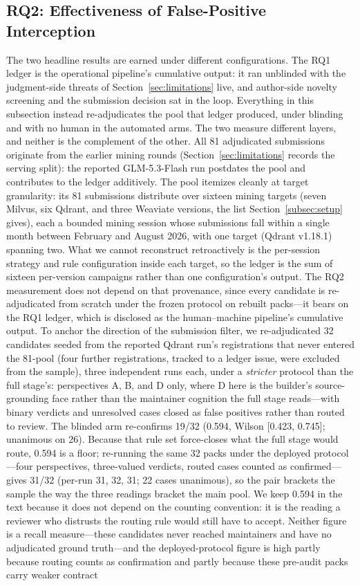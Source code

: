 \documentclass[acmsmall,screen,review,anonymous]{acmart}
\begin{document}
\subsection{RQ2: Effectiveness of False-Positive Interception}
\label{subsec:rq2}

The two headline results are earned under different configurations. The RQ1 ledger is the operational pipeline's cumulative output: it ran unblinded with the judgment-side threats of Section~\ref{sec:limitations} live, and author-side novelty screening and the submission decision sat in the loop. Everything in this subsection instead re-adjudicates the pool that ledger produced, under blinding and with no human in the automated arms. The two measure different layers, and neither is the complement of the other. All 81 adjudicated submissions originate from the earlier mining rounds (Section~\ref{sec:limitations} records the serving split): the reported GLM-5.3-Flash run postdates the pool and contributes to the ledger additively. The pool itemizes cleanly at target granularity: its 81 submissions distribute over sixteen mining targets (seven Milvus, six Qdrant, and three Weaviate versions, the list Section~\ref{subsec:setup} gives), each a bounded mining session whose submissions fall within a single month between February and August 2026, with one target (Qdrant v1.18.1) spanning two. What we cannot reconstruct retroactively is the per-session strategy and rule configuration inside each target, so the ledger is the sum of sixteen per-version campaigns rather than one configuration's output. The RQ2 measurement does not depend on that provenance, since every candidate is re-adjudicated from scratch under the frozen protocol on rebuilt packs---it bears on the RQ1 ledger, which is disclosed as the human--machine pipeline's cumulative output. To anchor the direction of the submission filter, we re-adjudicated 32 candidates seeded from the reported Qdrant run's registrations that never entered the 81-pool (four further registrations, tracked to a ledger issue, were excluded from the sample), three independent runs each, under a \emph{stricter} protocol than the full stage's: perspectives A, B, and D only, where D here is the builder's source-grounding face rather than the maintainer cognition the full stage reads---with binary verdicts and unresolved cases closed as false positives rather than routed to review. The blinded arm re-confirms 19/32 (0.594, Wilson [0.423, 0.745]; unanimous on 26). Because that rule set force-closes what the full stage would route, 0.594 is a floor; re-running the same 32 packs under the deployed protocol---four perspectives, three-valued verdicts, routed cases counted as confirmed---gives 31/32 (per-run 31, 32, 31; 22 cases unanimous), so the pair brackets the sample the way the three readings bracket the main pool. We keep 0.594 in the text because it does not depend on the counting convention: it is the reading a reviewer who distrusts the routing rule would still have to accept. Neither figure is a recall measure---these candidates never reached maintainers and have no adjudicated ground truth---and the deployed-protocol figure is high partly because routing counts as confirmation and partly because these pre-audit packs carry weaker contract 
\end{document}

